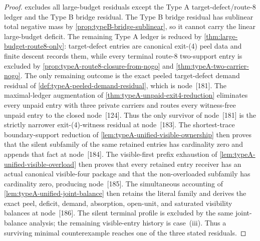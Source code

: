 \documentclass[11pt]{article}
\begin{document}
\begin{proof}
 excludes all large-budget residuals except the Type A
target-defect/route-8 ledger and the Type B bridge residual.  The Type B bridge
residual has sublinear total negative mass by
\cref{prop:typeB-bridge-sublinear}, so it cannot carry the linear large-budget
deficit.  The remaining Type A ledger is reduced by
\cref{thm:large-budget-route8-only}: target-defect entries are canonical
exit-\textup{(4)} peel data and finite descent records them, while every
terminal route-8 two-support entry is excluded by
\cref{prop:typeA-route8-closure-from-nogo} and
\cref{thm:typeA-two-carrier-nogo}.  The only remaining outcome is the exact
peeled target-defect demand residual of
\cref{def:typeA-peeled-demand-residual}, which is node~[181].  The maximal-ledger
augmentation of \cref{thm:typeA-unpaid-exit4-reduction} eliminates every
unpaid entry with three private carriers and routes every witness-free unpaid
entry to the closed node~[124].  Thus the only survivor of node~[181] is the
strictly narrower exit-\textup{(4)}-witness residual at node~[183].  The
shortest-trace boundary-support reduction of
\cref{lem:typeA-unified-visible-ownership} then proves that the silent
subfamily of the same retained entries has cardinality zero and appends that
fact at node~[184].  The visible-first prefix exhaustion of
\cref{lem:typeA-unified-visible-overload} then proves that every retained
entry receiver has an actual canonical visible-four package and that the
non-overloaded subfamily has cardinality zero, producing node~[185].
The simultaneous accounting of
\cref{lem:typeA-unified-joint-balance} then retains the literal family and
derives the exact peel, deficit, demand, absorption, open-unit, and saturated
visibility balances at node~[186].
The silent terminal profile is excluded by the same joint-balance analysis;
the remaining visible-entry history is case~\textup{(iii)}.  Thus a surviving
minimal counterexample reaches one of the three stated residuals.
\end{proof}
\end{document}
